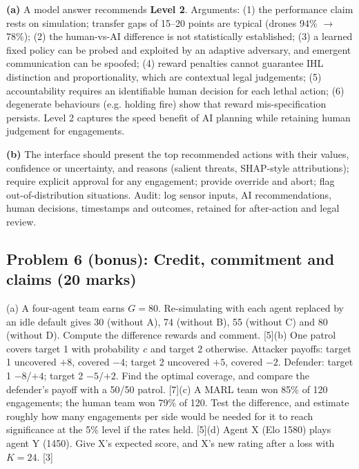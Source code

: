 \documentclass[11pt]{article}
\begin{document}
\begin{soln}\textbf{(a)} A model answer recommends \textbf{Level 2}. Arguments: (1) the performance claim rests on simulation; transfer gaps of 15--20 points are typical (drones 94\% $\rightarrow$ 78\%); (2) the human-vs-AI difference is not statistically established; (3) a learned fixed policy can be probed and exploited by an adaptive adversary, and emergent communication can be spoofed; (4) reward penalties cannot guarantee IHL distinction and proportionality, which are contextual legal judgements; (5) accountability requires an identifiable human decision for each lethal action; (6) degenerate behaviours (e.g. holding fire) show that reward mis-specification persists. Level 2 captures the speed benefit of AI planning while retaining human judgement for engagements.

\textbf{(b)} The interface should present the top recommended actions with their values, confidence or uncertainty, and reasons (salient threats, SHAP-style attributions); require explicit approval for any engagement; provide override and abort; flag out-of-distribution situations. Audit: log sensor inputs, AI recommendations, human decisions, timestamps and outcomes, retained for after-action and legal review.\end{soln}

\subsection{Problem 6 (bonus): Credit, commitment and claims \normalfont\small\color{GreyN}(20 marks)}

\begin{prob}(a) A four-agent team earns $G=80$. Re-simulating with each agent replaced by an idle default gives 30 (without A), 74 (without B), 55 (without C) and 80 (without D). Compute the difference rewards and comment. [5]\newline (b) One patrol covers target 1 with probability $c$ and target 2 otherwise. Attacker payoffs: target 1 uncovered $+8$, covered $-4$; target 2 uncovered $+5$, covered $-2$. Defender: target 1 $-8$/$+4$; target 2 $-5$/$+2$. Find the optimal coverage, and compare the defender's payoff with a 50/50 patrol. [7]\newline (c) A MARL team won 85\% of 120 engagements; the human team won 79\% of 120. Test the difference, and estimate roughly how many engagements per side would be needed for it to reach significance at the 5\% level if the rates held. [5]\newline (d) Agent X (Elo 1580) plays agent Y (1450). Give X's expected score, and X's new rating after a loss with $K=24$. [3]\end{prob}
\end{document}
